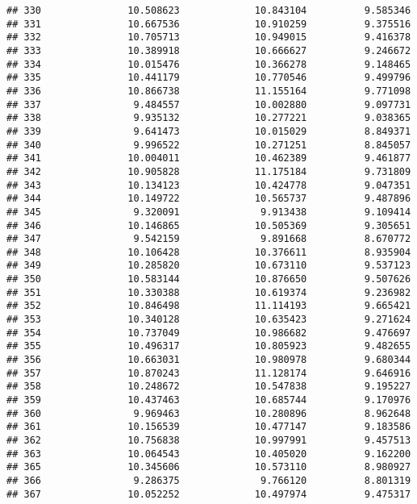 \documentclass[
]{article}
\begin{document}
\begin{verbatim}
## 330               10.508623             10.843104          9.585346
## 331               10.667536             10.910259          9.375516
## 332               10.705713             10.949015          9.416378
## 333               10.389918             10.666627          9.246672
## 334               10.015476             10.366278          9.148465
## 335               10.441179             10.770546          9.499796
## 336               10.866738             11.155164          9.771098
## 337                9.484557             10.002880          9.097731
## 338                9.935132             10.277221          9.038365
## 339                9.641473             10.015029          8.849371
## 340                9.996522             10.271251          8.845057
## 341               10.004011             10.462389          9.461877
## 342               10.905828             11.175184          9.731809
## 343               10.134123             10.424778          9.047351
## 344               10.149722             10.565737          9.487896
## 345                9.320091              9.913438          9.109414
## 346               10.146865             10.505369          9.305651
## 347                9.542159              9.891668          8.670772
## 348               10.106428             10.376611          8.935904
## 349               10.285820             10.673110          9.537123
## 350               10.583144             10.876650          9.507626
## 351               10.330388             10.619374          9.236982
## 352               10.846498             11.114193          9.665421
## 353               10.340128             10.635423          9.271624
## 354               10.737049             10.986682          9.476697
## 355               10.496317             10.805923          9.482655
## 356               10.663031             10.980978          9.680344
## 357               10.870243             11.128174          9.646916
## 358               10.248672             10.547838          9.195227
## 359               10.437463             10.685744          9.170976
## 360                9.969463             10.280896          8.962648
## 361               10.156539             10.477147          9.183586
## 362               10.756838             10.997991          9.457513
## 363               10.064543             10.405020          9.162200
## 365               10.345606             10.573110          8.980927
## 366                9.286375              9.766120          8.801319
## 367               10.052252             10.497974          9.475317

\end{verbatim}
\end{document}
